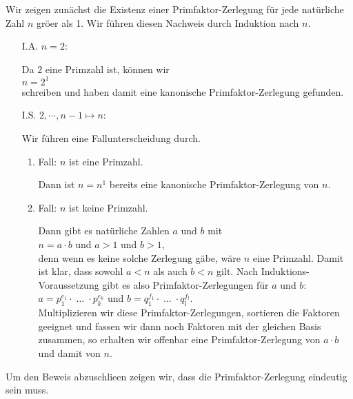 \proof
Wir zeigen zun\"{a}chst die Existenz einer Primfaktor-Zerlegung f\"{u}r jede nat\"{u}rliche Zahl $n$ gr\"{o}\3er als
1.  Wir f\"{u}hren diesen Nachweis durch Induktion nach $n$.
\begin{enumerate}
\item[I.A.] $n=2$:

      Da $2$ eine Primzahl ist, k\"{o}nnen wir
      \\[0.2cm]
      \hspace*{1.3cm}
      $n = 2^1$
      \\[0.2cm]
      schreiben und haben damit eine kanonische Primfaktor-Zerlegung gefunden.
\item[I.S.] $2,\cdots,n\!-\!1 \mapsto n$: 

      Wir f\"{u}hren eine Fallunterscheidung durch.
      \begin{enumerate}
      \item Fall: $n$ ist eine Primzahl.

            Dann ist $n = n^1$  bereits eine kanonische Primfaktor-Zerlegung von $n$.
      \item Fall: $n$ ist keine Primzahl.  

            Dann gibt es nat\"{u}rliche Zahlen $a$ und $b$ mit
            \\[0.2cm]
            \hspace*{1.3cm}
            $n = a \cdot b$ \quad und $a > 1$ und $b > 1$,
            \\[0.2cm]
            denn wenn es keine solche Zerlegung g\"{a}be, w\"{a}re $n$ eine Primzahl. Damit ist klar, dass
            sowohl $a < n$ als auch $b < n$ gilt.  Nach Induktions-Voraussetzung gibt es also
            Primfaktor-Zerlegungen f\"{u}r $a$ und $b$:
            \\[0.2cm]
            \hspace*{1.3cm}
             $a = p_1^{e_1} \cdot \;\dots\; \cdot p_k^{e_k}$ \quad und \quad
             $b = q_1^{f_1} \cdot \;\dots\; \cdot q_l^{f_l}$.
            \\[0.2cm]
            Multiplizieren wir diese Primfaktor-Zerlegungen, sortieren die Faktoren geeignet und
            fassen wir dann noch Faktoren mit der gleichen Basis zusammen, so erhalten wir offenbar
            eine Primfaktor-Zerlegung von $a \cdot b$ und damit von $n$.
      \end{enumerate}
\end{enumerate}
Um den Beweis abzuschlie\3en zeigen wir, dass die Primfaktor-Zerlegung eindeutig sein muss.
